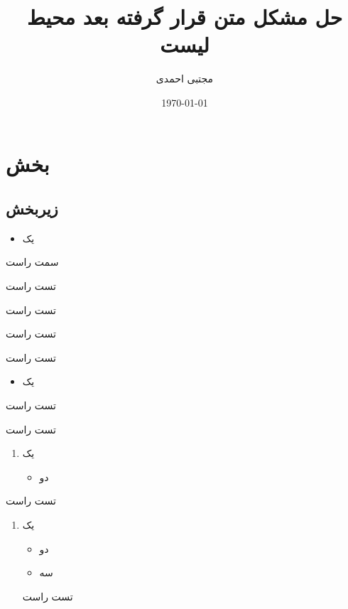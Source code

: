 \documentclass{beamer}
\title{حل مشکل متن قرار گرفته بعد محیط لیست}
\author{مجتبی احمدی}
\institute{دانشگاه: پیام‌نو‌ر مشگین شهر}
\date{\today}
\begin{document}
\section{بخش}
\subsection{زیربخش}
\begin{frame}
\begin{itemize}\raggedleft
\item یک
\end{itemize}
سمت راست
\end{frame}

\begin{frame}
تست راست
\begin{description}\raggedleft
\item[متن]
تست راست
\end{description}
تست راست
\end{frame}

\begin{frame}
تست راست
\begin{itemize}\raggedleft
\item یک
\end{itemize}
تست راست
\end{frame}

\begin{frame}
تست راست
\begin{enumerate}\raggedleft
\item یک
\begin{itemize}\raggedleft
\item دو
\end{itemize}
\end{enumerate}
تست راست
\end{frame}

\begin{frame}
\begin{enumerate}\raggedleft
  \item یک
    \begin{itemize}\raggedleft
    \item دو 
    \item سه
    \end{itemize}
تست راست
\end{enumerate}
\end{frame}
\end{document}

